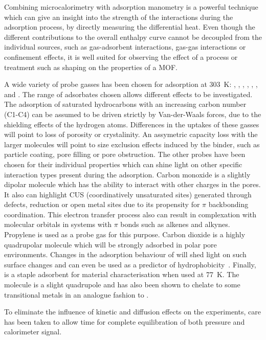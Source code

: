 Combining microcalorimetry with adsorption manometry is a powerful technique which can
give an insight into the strength of the interactions during the adsorption process,
by directly measuring the differential heat. Even though the different contributions 
to the overall enthalpy curve cannot be decoupled from the individual sources, 
such as gas-adsorbent interactions, gas-gas interactions or confinement effects, it 
is well suited for observing the effect of a process or treatment such as shaping
on the properties of a MOF.

A wide variety of probe gasses has been chosen for adsorption at \SI{303}{\kelvin}:
, , , , , ,  and .
The range of adsorbates chosen allows different effects to be investigated.
The adsorption of saturated hydrocarbons with an increasing carbon number (C1-C4) can be
assumed to be driven strictly by Van-der-Waals forces, due to the shielding effects 
of the hydrogen atoms. Differences in the uptakes of these gasses will point to 
loss of porosity or crystalinity. An assymetric capacity loss with the larger molecules 
will point to size exclusion effects induced by the binder, such as particle coating,
pore filling or pore obstruction.
The other probes have been chosen for their 
individual properties which can shine light on other specific interaction types 
present during the adsorption. 
Carbon monoxide is a slightly dipolar molecule which has the ability to interact with
other charges in the pores. It also can highlight CUS (coordinatively unsaturated sites)
generated through defects, reduction or open metal sites due to its
propensity for \( \pi \) backbonding coordination.
This electron transfer process also can result in complexation with molecular 
orbitals in systems with \( \pi \) bonds such as alkenes and alkynes. Propylene is used 
as a probe gas for this purpose.
Carbon dioxide is a highly quadrupolar molecule which will be strongly adsorbed in 
polar pore environments. Changes in the adsorption behaviour of  will shed 
light on such surface changes and can even be used as a predictor of 
hydrophobicity~\cite{chanutScreeningEffectWater2017}.
Finally,  is a staple adsorbent for material characterisation when used at
\SI{77}{\kelvin}. The molecule is a slight quadrupole and has also been shown to 
chelate to some transitional metals in an analogue fashion to .

To eliminate the influence of kinetic and diffusion effects on the experiments,
care has been taken to allow time for complete equilibration of both pressure
and calorimeter signal.

